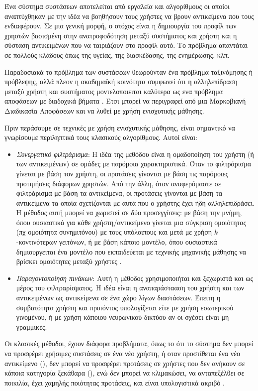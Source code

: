 Ένα σύστημα συστάσεων αποτελείται από εργαλεία και αλγορίθμους οι οποίοι αναπτύχθηκαν με την ιδέα να βοηθήσουν τους χρήστες να βρουν αντικείμενα που τους ενδιαφέρουν. Σε μια γενική μορφή, ο στόχος είναι η δημιουργία του προφίλ των χρηστών βασισμένη στην ανατροφοδότηση μεταξύ συστήματος και χρήστη και η σύσταση αντικειμένων που να ταιριάζουν στο προφίλ αυτό. Το πρόβλημα απαντάται σε πολλούς κλάδους όπως της υγείας, της διασκέδασης, της ενημέρωσης, κλπ.

Παραδοσιακά το πρόβλημα των συστάσεων θεωρούνταν ένα πρόβλημα ταξινόμησης ή πρόβλεψης, αλλά πλεον η ακαδημαϊκή κοινότητα συμφωνεί ότι η αλληλεπίδραση μεταξύ χρήστη και συστήματος μοντελοποιειται καλύτερα ως ενα πρόβλημα αποφάσεων με διαδοχικά βήματα \cite{rl_recommenders_2021}. Έτσι μπορεί να περιγραφεί από μια Μαρκοβιανή Διαδικασία Αποφάσεων και να λυθεί με χρήση ενισχυτικής μάθησης.

Πριν περάσουμε σε τεχνικές με χρήση ενισχυτικής μάθησης, είναι σημαντικό να γνωρίσουμε περιληπτικά τους κλασικούς αλγορίθμους. Αυτοί είναι:
\begin{itemize}
    \item \textit{Συνεργατικό φιλτράρισμα}: Η ιδέα της μεθόδου είναι η ομαδοποίηση του χρήστη (ή των αντικειμένων) σε ομάδες με παρόμοια χαρακτηριστικά. Όταν το φιλτράρισμα γίνεται με βάση τον χρήστη, οι προτάσεις γίνονται με βάση τις παρόμοιες προτιμήσεις διάφορων χρηστών. Από την άλλη, όταν αναφερόμαστε σε φιλτράρισμα με βάση τα αντικείμενα, οι προτάσεις γίνονται με βάση τα αντικείμενα τα οποία σχετίζονται με αυτά που ο χρήστης έχει ήδη αλληλεπιδράσει. Η μέθοδος αυτή μπορεί να χωριστεί σε δύο προσεγγίσεις: με βάση την μνήμη, όπου ουσιαστικά για κάθε χρήστη/αντικείμενο γίνεται μια σύγκριση ομοιότητας (πχ ομοιότητα συνημιτόνου) με τους υπόλοιπους και μετά με χρήση $k$-κοντινότερων γειτόνων, ή με βάση κάποιο μοντέλο, όπου ουσιαστικά δημιουργειται ένα μοντέλο που εκπαιδεύεται με τεχνικής μηχανικής μάθησης να βρίσκει ομοιότητες μεταξύ χρήστες \cite{7872755}.
    \item \textit{Παραγοντοποίηση πινάκων}: Αυτή η μέθοδος χρησιμοποιήται και ξεχωριστά και ως μέρος του φιλτραρίσματος. Η ιδέα είναι η αναπαράστααση του χρήστη και των αντικειμένων ως αντικείμενα σε ένα χώρο λίγων διαστάσεων. Έπειτη η συμβατότητα χρήστη και προιόντος υπολογίζεται είτε με χρήση εσωτερικού γινομένου, ή με χρήση κάποιου νευρωνικού δικτύου αν οι σχέσει είναι μη γραμμικές.
\end{itemize}

Οι κλασικές μέθοδοι, έχουν διάφορα προβλήματα, όπως το ότι το σύστημα δεν μπορεί να προσφέρει χρήσιμες συστάσεις σε ένα νέο χρήστη, ή οταν προστίθεται ένα νέο αντικείμενο (), δεν μπορεί να προσφέρει προτάσεις σε χρήστες που δεν ανήκουν σε κάποια κατηγορία ξεκάθαρα (), ενώ δεν μπορεί να κλιμακώσει, να ανταπεξέλθει σε ποικιλία, έχει χαμηλής ποιότητας προτάσεις, και είναι υπολογιστικά ακριβό \cite{jannach_zanker_felfernig_friedrich_2010}.


